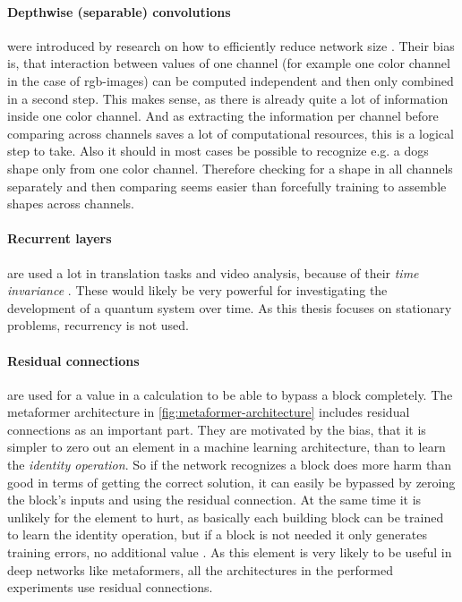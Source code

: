 \paragraph{Depthwise (separable) convolutions} were introduced by research on how to efficiently reduce network size \cite{mobileNetPaper}.
Their bias is, that interaction between values of one channel (for example one color channel in the case of rgb-images) can be computed independent and then only combined in a second step.
This makes sense, as there is already quite a lot of information inside one color channel. 
And as extracting the information per channel before comparing across channels saves a lot of computational resources, this is a logical step to take.
Also it should in most cases be possible to recognize e.g. a dogs shape only from one color channel. 
Therefore checking for a shape in all channels separately and then comparing seems easier than forcefully training to assemble shapes across channels.

\paragraph{Recurrent layers} are used a lot in translation tasks and video analysis, because of their \emph{time invariance} \cite{relationalInductiveBiasesAndGraphNetworks}. 
These would likely be very powerful for investigating the development of a quantum system over time. 
As this thesis focuses on stationary problems, recurrency is not used.

\paragraph{Residual connections} are used for a value in a calculation to be able to bypass a block completely.
The metaformer architecture in \autoref{fig:metaformer-architecture} includes residual connections as an important part.
They are motivated by the bias, that it is simpler to zero out an element in a machine learning architecture, than to learn the \emph{identity operation}. 
So if the network recognizes a block does more harm than good in terms of getting the correct solution, it can easily be bypassed by zeroing the block's inputs and using the residual connection. 
At the same time it is unlikely for the element to hurt, as basically each building block can be trained to learn the identity operation, but if a block is not needed it only generates training errors, no additional value \cite{deepResidualLearningForImageRecognition}.
As this element is very likely to be useful in deep networks like metaformers, all the architectures in the performed experiments use residual connections.

